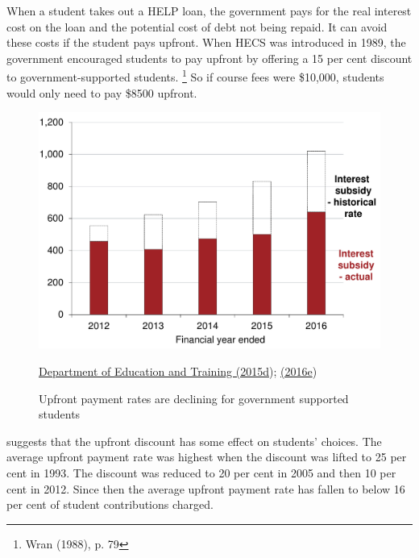 \documentclass[embargoed]{grattan}
\begin{document}
When a student takes out a \gls{HELP} loan, the government pays for the real interest cost on the loan and the potential cost of debt not being repaid.
It can avoid these costs if the student pays upfront.
When \gls{HECS} was introduced in 1989, the government encouraged students to pay upfront by offering a 15 per cent discount to government-supported students.%
\footnote{Wran (1988), p. 79} So if course fees were \$10,000, students would only need to pay \$8500 upfront.

\begin{figure}
\caption{Upfront payment rates are declining for government supported students}\label{fig:fig6-upfront-payment-rates-are-declining-for-govt-supported-students}

\includegraphics[page=6]{atlas/Chartpack.pdf}

{\protect\hyperlink{_ENREF_27}{Department of Education and Training (2015d}); \protect\hyperlink{_ENREF_33}{(2016e})}
\end{figure}

 suggests that the upfront discount has some effect on students' choices.
The average upfront payment rate was highest when the discount was lifted to 25 per cent in 1993.
The discount was reduced to 20 per cent in 2005 and then 10 per cent in 2012.
Since then the average upfront payment rate has fallen to below 16 per cent of student contributions charged.
\end{document}
